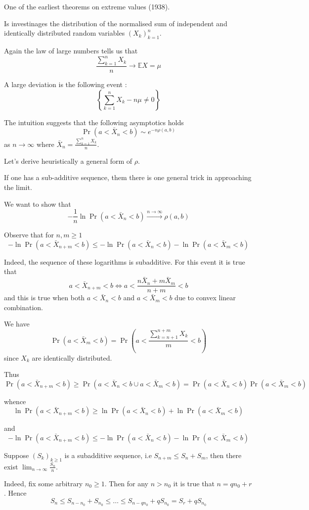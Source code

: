 \documentclass[a4paper]{article}
\newcommand{\obj}[1]{{\left\{ #1 \right \}}}
\newcommand{\brac}[1]{{\left ( #1 \right )}}
\newcommand{\Ex}{\mathbb{E}}
\begin{document}
One of the earliest theorems on extreme values (1938).

Is investinages the distribution of the normalised sum of independent and identically distributed random variables $\brac{X_k}_{k=1}^n$.

Again the law of large numbers tells us that
\[\frac{\sum_{k=1}^n X_k}{n} \to \Ex X = \mu\]

A large deviation is the following event :
\[\obj{ \sum_{k=1}^n X_k - n\mu \neq 0 }\]

The intuition suggests that the following asymptotics holds
\[\Pr\brac{a < \bar{X}_n < b} \sim e^{-n \rho(a,b)}\] as $n \to \infty$ where $\bar{X}_n = \frac{\sum_{k=1}^n X_k}{n}$.

Let's derive heuristically a general form of $\rho$.

If one has a sub-additive sequence, them there is one general trick in approaching the limit.

We want to show that 
\[-\frac{1}{n}\ln \Pr(a<\bar{X}_n<b) \overset{n\to\infty}{\to} \rho(a,b)\]

Observe that for $n,m\geq 1$
\[-\ln \Pr(a<\bar{X}_{n+m}<b) \leq - \ln \Pr(a<\bar{X}_n<b) - \ln \Pr(a<\bar{X}_m<b)\]

Indeed, the sequence of these logarithms is subadditive.
For this event it is true that
\[a<\bar{X}_{n+m}<b \Leftrightarrow a<\frac{n \bar{X}_n + m \bar{X}_m}{n+m}<b \]
and this is true when both $a<\bar{X}_n<b$ and $a<\bar{X}_m<b$ due to convex linear combination.

We have 
\[\Pr\brac{a<\bar{X}_m<b} = \Pr\brac{a<\frac{\sum_{k=n+1}^{n+m}X_k}{m}<b}\]
since $X_k$ are identically distributed.

Thus 
\[\Pr\brac{a<\bar{X}_{n+m}<b} \geq \Pr\brac{a<\bar{X}_n<b \cup a<\bar{X}_m<b} = \Pr\brac{a<\bar{X}_n<b}\Pr\brac{a<\bar{X}_m<b} \]

whence 
\[\ln \Pr\brac{a<\bar{X}_{n+m}<b} \geq \ln \Pr\brac{a<\bar{X}_n<b} + \ln\Pr\brac{a<\bar{X}_m<b} \]

and
\[-\ln \Pr\brac{a<\bar{X}_{n+m}<b} \leq -\ln \Pr\brac{a<\bar{X}_n<b}  - \ln\Pr\brac{a<\bar{X}_m<b} \]

Suppose $\brac{S_k}_{k\geq1}$ is a subadditive sequence, i.e $S_{n+m}\leq S_n + S_m$, then there exist $\lim_{n\to \infty} \frac{S_n}{n}$.

Indeed, fix some arbitrary $n_0\geq1$. Then for any $n > n_0$ it is true that $n = q n_0 + r$.  Hence 
\[S_n \leq S_{n-n_0} + S_{n_0}\leq \ldots \leq S_{n-q n_0} + q S_{n_0} = S_r + q S_{n_0}\]
\end{document}
